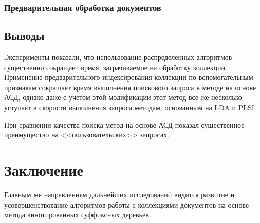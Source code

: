 \documentclass[12pt]{report}
\begin{document}
\subsection{Предварительная обработка документов}


\section{Выводы}

Эксперименты показали, что использование распределенных алгоритмов существенно сокращает время, затрачиваемое на обработку коллекции. Применение предварительного индексирования коллекции по вспомогательным признакам сокращает время выполнения поискового запроса в методе на основе АСД, однако даже с учетом этой модификации этот метод все же несколько уступает в скорости выполнения запроса методам, основанным на LDA и PLSI. 

При сравнении качества поиска метод на основе АСД показал существенное преимущество на <<пользовательских>> запросах.



\chapter*{Заключение}


Главным же направлением дальнейших исследований видится развитие и усовершенствование алгоритмов работы с коллекциями документов на основе метода аннотированных суффиксных деревьев.


\newpage
\end{document}
